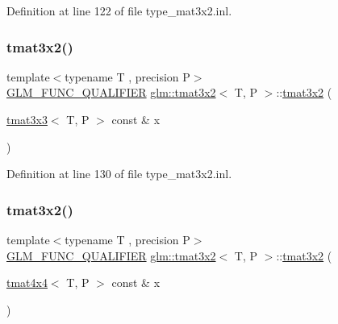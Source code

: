 Definition at line 122 of file type\+\_\+mat3x2.\+inl.

\mbox{\label{structglm_1_1tmat3x2_a3578a509c6af05bf0319417803261991}} 
\subsubsection{\texorpdfstring{tmat3x2()}{tmat3x2()}\hspace{0.1cm}{\footnotesize\ttfamily [12/22]}}
{\footnotesize\ttfamily template$<$typename T , precision P$>$ \\
\mbox{\hyperlink{setup_8hpp_a33fdea6f91c5f834105f7415e2a64407}{G\+L\+M\+\_\+\+F\+U\+N\+C\+\_\+\+Q\+U\+A\+L\+I\+F\+I\+ER}} \mbox{\hyperlink{structglm_1_1tmat3x2}{glm\+::tmat3x2}}$<$ T, P $>$\+::\mbox{\hyperlink{structglm_1_1tmat3x2}{tmat3x2}} (\begin{DoxyParamCaption}\item[{\mbox{\hyperlink{structglm_1_1tmat3x3}{tmat3x3}}$<$ T, P $>$ const \&}]{x }\end{DoxyParamCaption})}



Definition at line 130 of file type\+\_\+mat3x2.\+inl.

\mbox{\label{structglm_1_1tmat3x2_ab66003b5f215e9eb712561b3b0ec39d2}} 
\subsubsection{\texorpdfstring{tmat3x2()}{tmat3x2()}\hspace{0.1cm}{\footnotesize\ttfamily [13/22]}}
{\footnotesize\ttfamily template$<$typename T , precision P$>$ \\
\mbox{\hyperlink{setup_8hpp_a33fdea6f91c5f834105f7415e2a64407}{G\+L\+M\+\_\+\+F\+U\+N\+C\+\_\+\+Q\+U\+A\+L\+I\+F\+I\+ER}} \mbox{\hyperlink{structglm_1_1tmat3x2}{glm\+::tmat3x2}}$<$ T, P $>$\+::\mbox{\hyperlink{structglm_1_1tmat3x2}{tmat3x2}} (\begin{DoxyParamCaption}\item[{\mbox{\hyperlink{structglm_1_1tmat4x4}{tmat4x4}}$<$ T, P $>$ const \&}]{x }\end{DoxyParamCaption})}



